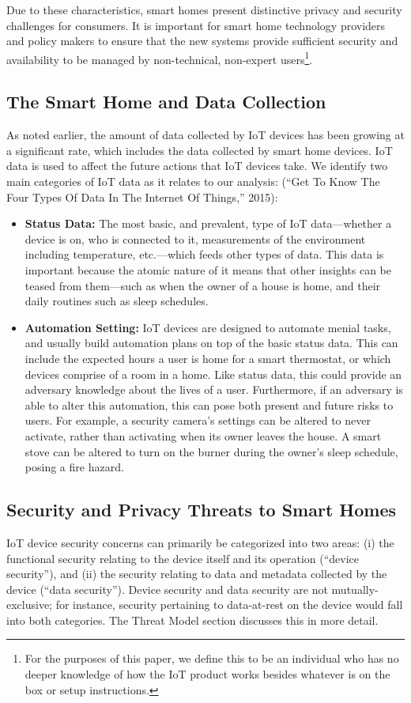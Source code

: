 Due to these characteristics, smart homes present distinctive privacy and security challenges for consumers. It is important for smart home technology providers and policy makers to ensure that the new systems provide sufficient security and availability to be managed by non-technical, non-expert users\footnote{For the purposes of this paper, we define this to be an individual who has no deeper knowledge of how the IoT product works besides whatever is on the box or setup instructions.}.

\subsection{The Smart Home and Data Collection}
As noted earlier, the amount of data collected by IoT devices has been growing at a significant rate, which includes the data collected by smart home devices. IoT data is used to affect the future actions that IoT devices take. We identify two main categories of IoT data as it relates to our analysis: (“Get To Know The Four Types Of Data In The Internet Of Things,” 2015):

\begin{itemize}
\item {\bf Status Data:} The most basic, and prevalent, type of IoT data---whether a device is on, who is connected to it, measurements of the environment including temperature, etc.---which feeds other types of data. This data is important because the atomic nature of it means that other insights can be teased from them---such as when the owner of a house is home, and their daily routines such as sleep schedules.
\item {\bf Automation Setting:} IoT devices are designed to automate menial tasks, and usually build automation plans on top of the basic status data. This can include the expected hours a user is home for a smart thermostat, or which devices comprise of a room in a home. Like status data, this could provide an adversary knowledge about the lives of a user. Furthermore, if an adversary is able to alter this automation, this can pose both present and future risks to users. For example, a security camera’s settings can be altered to never activate, rather than activating when its owner leaves the house. A smart stove can be altered to turn on the burner during the owner’s sleep schedule, posing a fire hazard.
\end{itemize}

\subsection{Security and Privacy Threats to Smart Homes}
IoT device security concerns can primarily be categorized into two areas: (i) the functional security relating to the device itself and its operation (“device security”), and (ii) the security relating to data and metadata collected by the device (“data security”). Device security and data security are not mutually-exclusive; for instance, security pertaining to data-at-rest on the device would fall into both categories. The Threat Model section discusses this in more detail.

